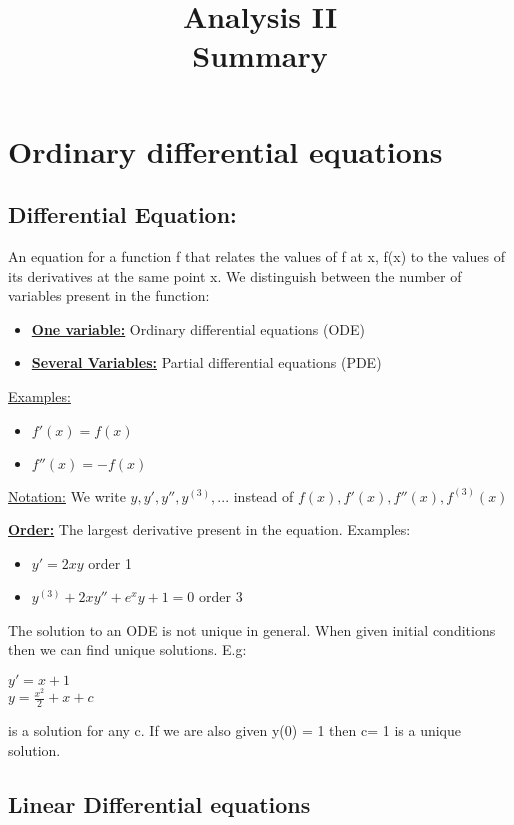 \documentclass[8pt]{extreport}
\title{Analysis II\\Summary}
\begin{document}
	\maketitle
	\newpage

\chapter{Ordinary differential equations}
\section{Differential Equation:} 
An equation for a function f that relates the values of f at x, f(x) to the values of its derivatives at the same point x. We distinguish between the number of variables present in the function:
\begin{itemize}
\item \underline{\textbf{One variable:}} Ordinary differential equations (ODE)
\item \underline{\textbf{Several Variables:}} Partial differential equations (PDE)
\end{itemize}

\underline{Examples:}
\begin{itemize}
\item $f'(x) = f(x)$
\item $f''(x) = -f(x)$
\end{itemize}

\underline{Notation:} We write $y,y',y'',y^{(3)},...$ instead of $f(x),f'(x),f''(x),f^{(3)}(x)$ 

\textbf{\underline{Order:}} The largest derivative present in the equation. Examples:
\begin{itemize}
\item $y' = 2xy$ order 1
\item $y^{(3)} + 2xy'' + e^xy +1 = 0$ order 3
\end{itemize}


The solution to an ODE is not unique in general. When given initial conditions then we can find unique solutions. E.g:
\begin{center}
$y' = x+1$\\
$y = \frac{x^2}{2} + x + c$
\end{center}
is a solution for any c. If we are also given y(0) = 1 then c= 1 is a unique solution.

\section{Linear Differential equations}
\end{document}
